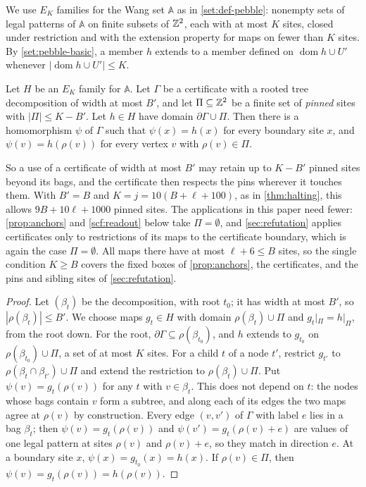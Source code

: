 We use $E_K$ families for the Wang set $\mathbb A$ as in \cref{set:def-pebble}: nonempty sets of legal patterns of $\mathbb A$ on finite subsets of $\mathbb{Z}^2$, each with at most $K$ sites, closed under restriction and with the extension property for maps on fewer than $K$ sites. By \cref{set:pebble-basic}, a member $h$ extends to a member defined on $\operatorname{dom}h\cup U'$ whenever $|\operatorname{dom}h\cup U'|\le K$.

\begin{lemma}[Transfer]\label{lem:transfer}
Let $H$ be an $E_K$ family for $\mathbb A$. Let $\Gamma$ be a certificate with a rooted tree decomposition of width at most $B'$, and let $\Pi\subseteq\mathbb{Z}^2$ be a finite set of \emph{pinned} sites with $|\Pi|\le K-B'$. Let $h\in H$ have domain $\partial\Gamma\cup\Pi$. Then there is a homomorphism $\psi$ of $\Gamma$ such that $\psi(x)=h(x)$ for every boundary site $x$, and $\psi(v)=h(\rho(v))$ for every vertex $v$ with $\rho(v)\in\Pi$.
\end{lemma}

So a use of a certificate of width at most $B'$ may retain up to $K-B'$ pinned sites beyond its bags, and the certificate then respects the pins wherever it touches them. With $B'=B$ and $K=j=10(B+\ell+100)$, as in \cref{thm:halting}, this allows $9B+10\ell+1000$ pinned sites. The applications in this paper need fewer: \cref{prop:anchors} and \cref{scf:readout} below take $\Pi=\emptyset$, and \cref{sec:refutation} applies certificates only to restrictions of its maps to the certificate boundary, which is again the case $\Pi=\emptyset$. All maps there have at most $\ell+6\le B$ sites, so the single condition $K\ge B$ covers the fixed boxes of \cref{prop:anchors}, the certificates, and the pins and sibling sites of \cref{sec:refutation}.

\begin{proof}
Let $(\beta_t)$ be the decomposition, with root $t_0$; it has width at most $B'$, so $|\rho(\beta_t)|\le B'$. We choose maps $g_t\in H$ with domain $\rho(\beta_t)\cup\Pi$ and $g_t|_\Pi=h|_\Pi$, from the root down. For the root, $\partial\Gamma\subseteq\rho(\beta_{t_0})$, and $h$ extends to $g_{t_0}$ on $\rho(\beta_{t_0})\cup\Pi$, a set of at most $K$ sites. For a child $t$ of a node $t'$, restrict $g_{t'}$ to $\rho(\beta_t\cap\beta_{t'})\cup\Pi$ and extend the restriction to $\rho(\beta_t)\cup\Pi$. Put $\psi(v)=g_t(\rho(v))$ for any $t$ with $v\in\beta_t$. This does not depend on $t$: the nodes whose bags contain $v$ form a subtree, and along each of its edges the two maps agree at $\rho(v)$ by construction. Every edge $(v,v')$ of $\Gamma$ with label $e$ lies in a bag $\beta_t$; then $\psi(v)=g_t(\rho(v))$ and $\psi(v')=g_t(\rho(v)+e)$ are values of one legal pattern at sites $\rho(v)$ and $\rho(v)+e$, so they match in direction $e$. At a boundary site $x$, $\psi(x)=g_{t_0}(x)=h(x)$. If $\rho(v)\in\Pi$, then $\psi(v)=g_t(\rho(v))=h(\rho(v))$.
\end{proof}

